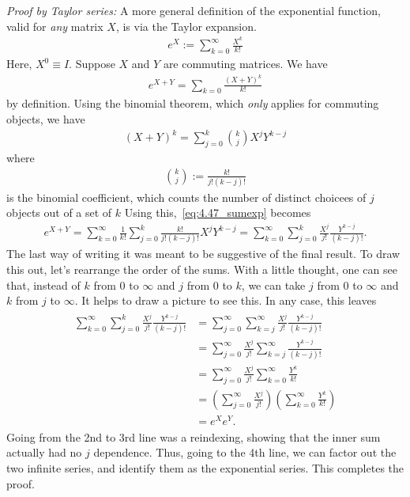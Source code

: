 \documentclass{book}
\begin{document}
    \emph{Proof by Taylor series:} A more general definition of the exponential function, valid for \emph{any} matrix $X$, is via the Taylor expansion.
    \begin{align}
        e^X := \sum_{k=0}^\infty \frac{X^k}{k!}
    \end{align}
    Here, $X^0 \equiv I$. Suppose $X$ and $Y$ are commuting matrices. We have 
    \begin{align}\label{eq:4.47_sumexp}
        e^{X+Y} = \sum_{k=0}\frac{(X+Y)^k}{k!}
    \end{align}
    by definition. Using the binomial theorem, which \emph{only} applies for commuting objects, we have
    \begin{align}
        (X+Y)^k = \sum_{j=0}^k \binom{k}{j} X^j Y^{k-j}
    \end{align}
    where 
    \begin{align}
        \binom{k}{j} := \frac{k!}{j! (k-j)!}
    \end{align}
    is the binomial coefficient, which counts the number of distinct choicees of $j$ objects out of a set of $k$ Using this,~\eqref{eq:4.47_sumexp} becomes
    \begin{align}
        e^{X+Y} = \sum_{k=0}^\infty \frac{1}{k!}\sum_{j=0}^k \frac{k!}{j! (k-j)!} X^j Y^{k-j} = \sum_{k=0}^\infty \sum_{j=0}^k \frac{X^j}{j!} \frac{Y^{k-j}}{(k-j)!}.
    \end{align}
    The last way of writing it was meant to be suggestive of the final result. To draw this out, let's rearrange the order of the sums. With a little thought, one can see that, instead of $k$ from 0 to $\infty$ and $j$ from $0$ to $k$, we can take $j$ from 0 to $\infty$ and $k$ from $j$ to $\infty$. It helps to draw a picture to see this. In any case, this leaves
    \begin{align}
    \begin{aligned}
        \sum_{k=0}^\infty \sum_{j=0}^k \frac{X^j}{j!} \frac{Y^{k-j}}{(k-j)!} &= \sum_{j=0}^\infty \sum_{k=j}^\infty \frac{X^j}{j!} \frac{Y^{k-j}}{(k-j)!} \\
        &= \sum_{j=0}^\infty \frac{X^j}{j!} \sum_{k=j}^\infty\frac{Y^{k-j}}{(k-j)!} \\
        &=\sum_{j=0}^\infty \frac{X^j}{j!} \sum_{k=0}^\infty\frac{Y^{k}}{k!} \\
        &= \left(\sum_{j=0}^\infty \frac{X^j}{j!}\right)\left(\sum_{k=0}^\infty\frac{Y^{k}}{k!}\right) \\
        &= e^X e^Y.
    \end{aligned}
    \end{align}
    Going from the 2nd to 3rd line was a reindexing, showing that the inner sum actually had no $j$ dependence. Thus, going to the 4th line, we can factor out the two infinite series, and identify them as the exponential series. This completes the proof.
\end{document}
